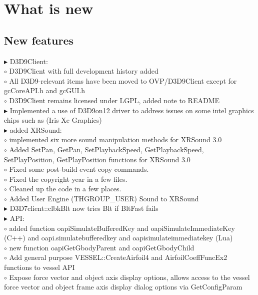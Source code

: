 \documentclass[Orbiter User Manual.tex]{subfiles}
\begin{document}
\section{What is new}

\subsection{New features}
\begin{sloppypar}%
$\blacktriangleright$ D3D9Client:\\
$\circ$ D3D9Client with full development history added\\
$\circ$ All D3D9-relevant items have been moved to OVP/D3D9Client except for gcCoreAPI.h and gcGUI.h\\
$\circ$ D3D9Client remains licensed under LGPL, added note to README\\
$\blacktriangleright$ Implemented a use of D3D9on12 driver to address issues on some intel graphics chips such as (Iris Xe Graphics)\\
$\blacktriangleright$ added XRSound:\\
$\circ$ implemented six more sound manipulation methods for XRSound 3.0\\
$\circ$ Added SetPan, GetPan, SetPlaybackSpeed, GetPlaybackSpeed, SetPlayPosition, GetPlayPosition functions for XRSound 3.0\\
$\circ$ Fixed some post-build event copy commands.\\
$\circ$ Fixed the copyright year in a few files.\\
$\circ$ Cleaned up the code in a few places.\\
$\circ$ Added User Engine (THGROUP\_USER) Sound to XRSound\\
$\blacktriangleright$ D3D7client::clbkBlt now tries Blt if BltFast fails\\
$\blacktriangleright$ API:\\
$\circ$ added function oapiSimulateBufferedKey and oapiSimulateImmediateKey (C++) and oapi.simulatebufferedkey and oapisimulateimmediatekey (Lua)\\
$\circ$ new function oapiGetGbodyParent and oapiGetGbodyChild\\
$\circ$ Add general purpose VESSEL::CreateAirfoil4 and AirfoilCoeffFuncEx2 functions to vessel API\\
$\circ$ Expose force vector and object axis display options, allows access to the vessel force vector and object frame axis display dialog options via GetConfigParam\\

\end{sloppypar}
\end{document}
